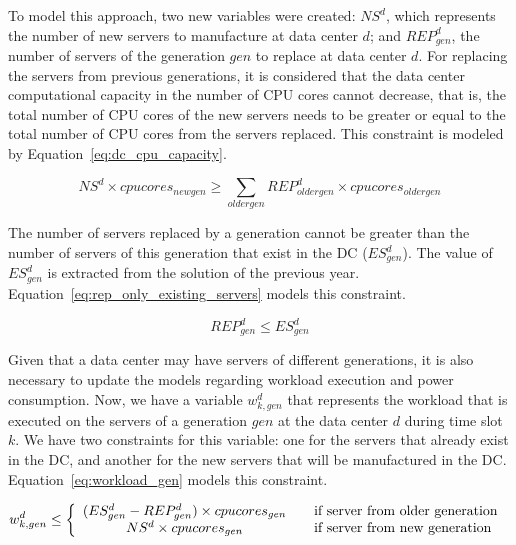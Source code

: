 To model this approach, two new variables were created: $NS^d$, which represents the number of new servers to manufacture at data center $d$; and $REP_{gen}^d$, the number of servers of the generation $gen$ to replace at data center $d$. For replacing the servers from previous generations, it is considered that the data center computational capacity in the number of CPU cores cannot decrease, that is, the total number of CPU cores of the new servers needs to be greater or equal to the total number of CPU cores from the servers replaced. This constraint is modeled by Equation~\eqref{eq:dc_cpu_capacity}.


\begin{equation} \label{eq:dc_cpu_capacity}
 NS^d \times cpucores_{newgen} \geq \sum_{oldergen}  REP_{oldergen}^d \times cpucores_{oldergen}
\end{equation}

The number of servers replaced by a generation cannot be greater than the number of servers of this generation that exist in the DC ($ES_{gen}^d $). The value of  $ES_{gen}^d $ is extracted from the solution of the previous year. Equation~\eqref{eq:rep_only_existing_servers} models this constraint.

\begin{equation} \label{eq:rep_only_existing_servers}
 REP_{gen}^d \leq ES_{gen}^d 
\end{equation}


Given that a data center may have servers of different generations, it is also necessary to update the models regarding workload execution and power consumption. Now, we have a variable $w_{k,gen}^d$ that represents the workload that is executed on the servers of a generation $gen$ at the data center $d$ during time slot $k$. We have two constraints for this variable: one for the servers that already exist in the DC, and another for the new servers that will be manufactured in the DC. Equation~\eqref{eq:workload_gen} models this constraint.


\begin{equation} \label{eq:workload_gen}
w_{k,gen}^d \leq   \left\{ 
  \begin{array}{ c l }
    (ES_{gen}^d - REP_{gen}^d) \times cpucores_{gen}  & \quad \textrm{if server from older generation  }     \\
     NS^d \times cpucores_{gen}   & \quad \textrm{if server from new generation  }      \\
    
  \end{array}
\right.
\end{equation}

